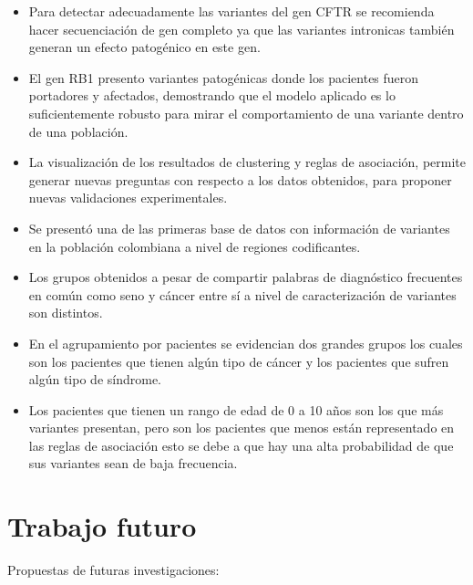 \begin{itemize}
	\item Para detectar adecuadamente las variantes del gen CFTR se recomienda hacer secuenciación de gen completo ya que las variantes intronicas también generan un efecto patogénico en este gen.
	
	\item El gen RB1 presento variantes patogénicas donde los pacientes fueron portadores y afectados, demostrando que el modelo aplicado es lo suficientemente robusto para mirar el comportamiento de una variante dentro de una población.
	
	\item La visualización de los resultados de clustering y reglas de asociación, permite generar nuevas preguntas con respecto a los datos obtenidos, para proponer nuevas validaciones experimentales.
	
	\item Se presentó una de las primeras base de datos con información de variantes en la población colombiana a nivel de regiones codificantes.
	
	\item Los grupos obtenidos a pesar de compartir palabras de diagnóstico frecuentes en común como seno y cáncer entre sí a nivel de caracterización de variantes son distintos.
	
	\item En el agrupamiento por pacientes se evidencian dos grandes grupos los cuales son los pacientes que tienen algún tipo de cáncer y los pacientes que sufren algún tipo de síndrome. 
	
	\item Los pacientes que tienen un rango de edad de 0 a 10 años son los que más variantes presentan, pero son los pacientes que menos están representado en las reglas de asociación esto se debe a que hay una alta probabilidad de que sus variantes sean de baja frecuencia. 	
	 
\end{itemize}

\section{Trabajo futuro}

Propuestas de futuras investigaciones:

